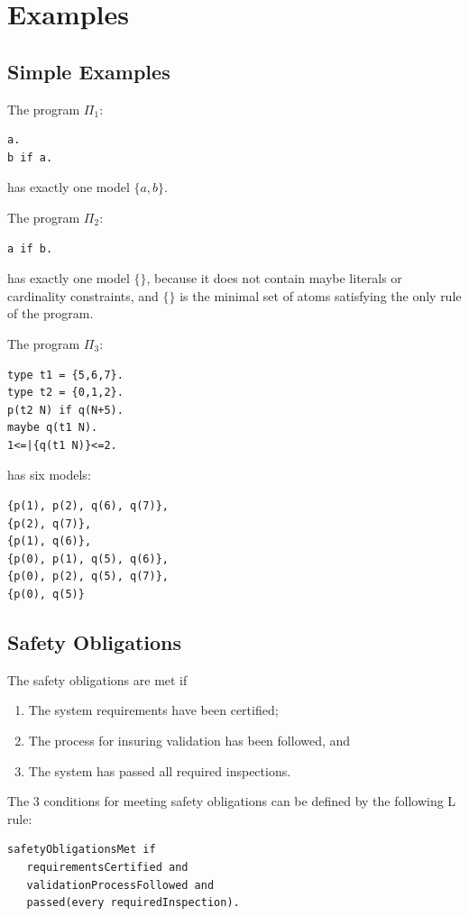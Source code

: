 \documentclass[a4paper,10pt]{article}
\begin{document}
\section{Examples}

\subsection{Simple Examples} 

The program $\Pi_1$:
\begin{verbatim}
a.
b if a.
\end{verbatim}
has exactly one model $\{a,b\}$.

\medskip\noindent
The program $\Pi_2$:
\begin{verbatim}
a if b.
\end{verbatim}
has exactly one model $\{\}$, because it  does not contain maybe literals or cardinality constraints, and $\{\}$ is the minimal set of atoms satisfying the only rule of the program.

\medskip\noindent
The program $\Pi_3$:
\begin{verbatim}
type t1 = {5,6,7}.
type t2 = {0,1,2}.
p(t2 N) if q(N+5).
maybe q(t1 N).
1<=|{q(t1 N)}<=2. 
\end{verbatim}
has six models:
\begin{verbatim}
{p(1), p(2), q(6), q(7)},
{p(2), q(7)},
{p(1), q(6)},
{p(0), p(1), q(5), q(6)},
{p(0), p(2), q(5), q(7)},
{p(0), q(5)}
\end{verbatim}


\subsection{Safety Obligations}

The safety obligations are met if
\begin{enumerate}
 \item The system requirements have been certified;
 \item The process for insuring validation has been followed, and
  \item The system has passed all required inspections.
\end{enumerate}

\medskip\noindent
The 3 conditions for meeting safety obligations can be defined by the following L rule:

\begin{verbatim}
safetyObligationsMet if
   requirementsCertified and
   validationProcessFollowed and
   passed(every requiredInspection).
\end{verbatim}
\end{document}
